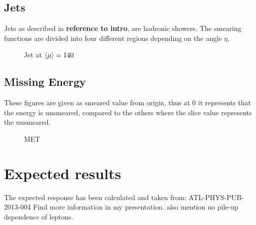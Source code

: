 \subsection{Jets}
Jets as described in \textbf{reference to intro}, are hadronic showers. The smearing functions are divided into four different regions depending on the angle $\eta$. 
 \begin{figure}[H] %
    \hfill
{}
    \hfill
    \hfill
{}
        \hfill
{}
            \hfill
{}
    \caption{Jet at $\left<\mu\right>=140$}
    \label{fig:jet}
\end{figure}

\newpage
\subsection{Missing Energy}
These figures are given as smeared value from origin, thus at 0 it represents that the energy is unsmeared, compared to the others where the slice value represents the unsmeared. 
 \begin{figure}[H] %
    \hfill
        \hfill
   \caption{MET}
    \label{fig:MET}
  \end{figure}
\newpage
\section{Expected results}\label{cha:vali:sec:expr}

The expected response has been calculated and taken from: ATL-PHYS-PUB-2013-004
Find more information in my presentation. also mention no pile-up dependence of leptons.


